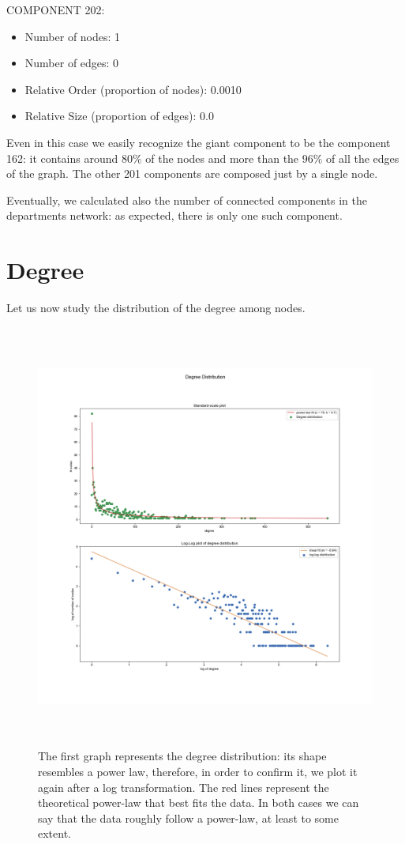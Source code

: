 \documentclass{report}
\theoremstyle{definition}
\theoremstyle{remark}
\begin{document}
COMPONENT 202:
\begin{itemize}
	\item Number of nodes: 1
	\item Number of edges: 0
	\item Relative Order (proportion of nodes): 0.0010
	\item Relative Size (proportion of edges): 0.0\\
\end{itemize}

Even in this case we easily recognize the giant component to be the component 162: it contains around $80\%$ of the nodes and more than the $96\%$ of all the edges of the graph. The other 201 components are composed just by a single node.

Eventually, we calculated also the number of connected components in the departments network: as expected, there is only one such component.
\newpage
\section*{Degree}

Let us now study the distribution of the degree among nodes.


\begin{figure} [H]
	\centering
	\centerline{\includegraphics[width = 18cm, height = 14cm, keepaspectratio]{degree_distribution_fit.png}}
	\label{Degree}
	\caption{The first graph represents the degree distribution: its shape resembles a power law, therefore, in order to confirm it, we plot it again after a log transformation. The red lines represent the theoretical power-law that best fits the data. In both cases we can say that the data roughly follow a power-law, at least to some extent.}
\end{figure}
\end{document}
